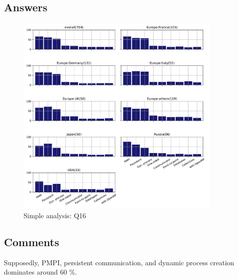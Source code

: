 
\subsection{Answers}


\begin{figure}[htb]
\begin{center}
\includegraphics[width=10cm]{../pdfs/Q16.pdf}
\caption{Simple analysis: Q16}
\label{fig:Q16}
\end{center}
\end{figure}

\subsection{Comments}

Supposedly, PMPI, persistent communication, and dynamic process
creation dominates around 60 \%. 
